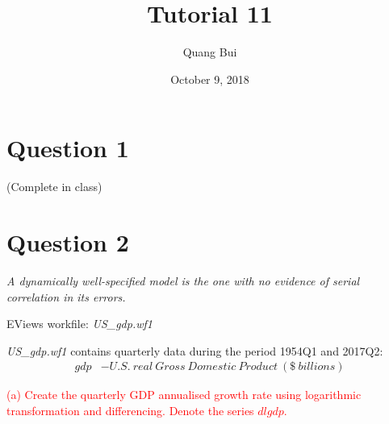\documentclass[12pt]{report}
\title{Tutorial 11}
\subtitle
{
\textbf{keywords}: time series,AR model, GDP, growth rate, residual plot, correlogram, white noise, Breusch-Godfrey test for serial correlation, F-test

\textbf{estimated reading time}: 38 minutes
}
\author{Quang Bui}
\date{October 9, 2018}
\begin{document}
\maketitle

\section*{Question 1}
\noindent (Complete in class)


\newpage
\section*{Question 2}
\noindent \textit{A dynamically well-specified model is the one with no evidence of serial correlation in its errors.}

\noindent EViews workfile: \textit{US\_gdp.wf1}

\noindent \textit{US\_gdp.wf1} contains quarterly data during the period 1954Q1 and 2017Q2:
\begin{align*}
gdp &- U.S.\ real\ Gross\ Domestic\ Product\ (\$\ billions)
\end{align*}

\noindent \textcolor{red}
{
	(a) Create the quarterly GDP annualised growth rate using logarithmic transformation and differencing. Denote the series $dlgdp$.
}

\end{document}

